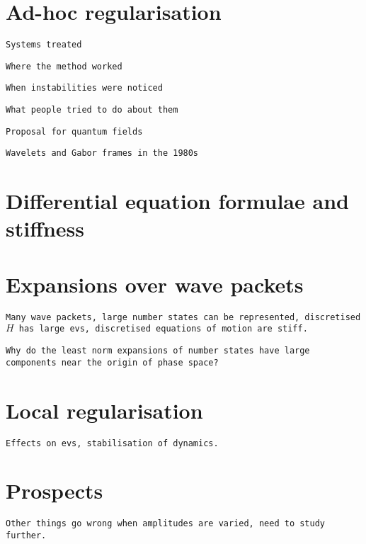 \documentclass[aip,jcp,graphicx,draft]{revtex4-1}
\begin{document}
\section{Ad-hoc regularisation}

{\tt Systems treated}

{\tt Where the method worked}

{\tt When instabilities were noticed}

{\tt What people tried to do about them}

{\tt Proposal for quantum fields}

{\tt Wavelets and Gabor frames in the 1980s}

\section{Differential equation formulae and stiffness}

\section{Expansions over wave packets}

{\tt Many wave packets, large number states can be represented, discretised $H$ has large evs, discretised equations of motion are stiff.}

{\tt Why do the least norm expansions of number states have large components near the origin of phase space?}

\section{Local regularisation}

{\tt Effects on evs, stabilisation of dynamics.}

\section{Prospects}

{\tt Other things go wrong when amplitudes are varied, need to study further.}

\subsection{}
\subsubsection{}

\end{document}
